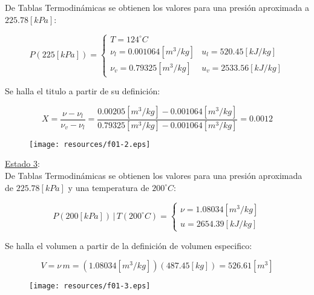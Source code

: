 \documentclass[letter,11pt]{article}
\begin{document}
\begin{enumerate}
De Tablas Termodinámicas se obtienen los valores para una presión aproximada a
$225.78[kPa]$:

\begin{equation*}
    P(225[kPa]) = \begin{cases}
        T = 124^\circ C \\
        \nu_l = 0.001064[m^3/kg] & u_l = 520.45[kJ/kg] \\
        \nu_v = 0.79325[m^3/kg]  & u_v = 2533.56[kJ/kg]
    \end{cases}
\end{equation*}

Se halla el titulo a partir de su definición:

\begin{equation*}
    X = \frac{\nu-\nu_l}{\nu_v-\nu_l}
      = \frac{0.00205[m^3/kg] - 0.001064[m^3/kg]}
      {0.79325[m^3/kg] - 0.001064[m^3/kg]}
      = 0.0012
\end{equation*}

\begin{figure}[H]
\centering
\texttt{[image: resources/f01-2.eps]}
\end{figure}

\underline{Estado 3}: \\
De Tablas Termodinámicas se obtienen los valores para una presión aproximada de
$225.78[kPa]$ y una temperatura de $200^\circ C$:

\begin{equation*}
    P(200[kPa])\,|\,T(200^\circ C) = \begin{cases}
        \nu = 1.08034[m^3/kg] \\
        u = 2654.39[kJ/kg]
    \end{cases}
\end{equation*}

Se halla el volumen a partir de la definición de volumen especifico:

\begin{equation*}
    V = \nu\,m = (1.08034[m^3/kg])(487.45[kg]) = 526.61[m^3]
\end{equation*}

\begin{figure}[H]
\centering
\texttt{[image: resources/f01-3.eps]}
\end{figure}


\end{enumerate}
\end{document}
